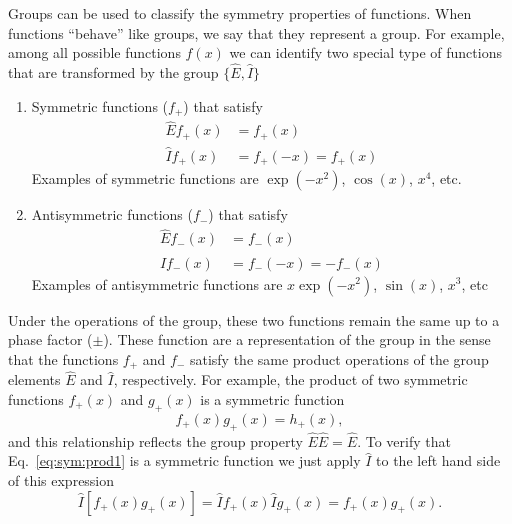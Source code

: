 \documentclass[../Main/chem532-notes.tex]{subfiles}
\begin{document}
Groups can be used to classify the symmetry properties of functions. When functions ``behave'' like groups, we say that they represent a group.
For example, among all possible functions $f(x)$ we can identify two special type of functions that are transformed by the group $\{\hat{E},\hat{I}\}$
\begin{enumerate}
\item Symmetric functions ($f_{+}$) that satisfy 
\begin{equation}
\begin{split}
\hat{E} f_{+}(x) & = f_{+}(x) \\
\hat{I} f_{+}(x) & = f_{+}(-x) = f_{+}(x)
\end{split}
\end{equation}
Examples of symmetric functions are $\exp(-x^2)$, $\cos(x)$, $x^4$, etc.

\item Antisymmetric functions ($f_{-}$) that satisfy 
\begin{equation}
\begin{split}
\hat{E} f_{-}(x) & = f_{-}(x) \\
\hat{I} f_{-}(x) & = f_{-}(-x) = -f_{-}(x)
\end{split}
\end{equation}
Examples of antisymmetric functions are $x \exp(-x^2)$, $\sin(x)$, $x^3$, etc
\end{enumerate}
Under the operations of the group, these two functions remain the same up to a phase factor ($\pm$).
These function are a representation of the group in the sense that the functions $f_{+}$ and $f_{-}$ satisfy the same product operations of the group elements $\hat{E}$ and $\hat{I}$, respectively. For example, the product of two symmetric functions $f_{+}(x)$ and $g_{+}(x)$ is a symmetric function
\begin{equation}
\label{eq:sym:prod1}
f_{+}(x) g_{+}(x) = h_{+}(x),
\end{equation}
and this relationship reflects the group property $\hat{E} \hat{E} = \hat{E}$.
To verify that Eq.~\eqref{eq:sym:prod1} is a symmetric function we just apply $\hat{I}$ to the left hand side of this expression
\begin{equation}
\hat{I} \left[ f_{+}(x) g_{+}(x) \right] = 
\hat{I} f_{+}(x)  \hat{I} g _{+}(x) = f_{+}(x) g_{+}(x).
\end{equation}
\end{document}
